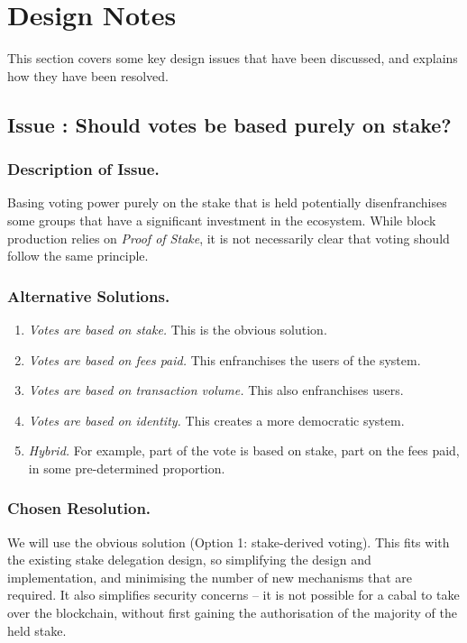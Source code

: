 \pagebreak
\section*{Design Notes}

This section covers some key design issues that have been discussed, and explains how they have been resolved.


\subsection*{Issue \theissue{}: Should votes be based purely on stake?}

\subsubsection*{Description of Issue.}

Basing voting power purely on the stake that is held potentially disenfranchises some groups that have a
significant investment in the ecosystem.  While block production relies on \emph{Proof of Stake},
it is not necessarily clear that voting should follow the same principle.

\subsubsection*{Alternative Solutions.}

\begin{enumerate}
\item
  \emph{Votes are based on stake.}  This is the obvious solution.
\item
  \emph{Votes are based on fees paid.}  This enfranchises the users of the system.
\item
  \emph{Votes are based on transaction volume.}  This also enfranchises users.
\item
  \emph{Votes are based on identity.}  This creates a more democratic system.
\item
  \emph{Hybrid.}  For example, part of the vote is based on stake, part on the fees paid, in some pre-determined proportion.
\end{enumerate}

\subsubsection*{Chosen Resolution.}

We will use the obvious solution (Option 1: stake-derived voting).  This fits
with the existing stake delegation design, so simplifying the design and
implementation, and minimising the number of new mechanisms that are required.
It also simplifies security concerns -- it is not possible for a cabal to take
over the blockchain, without first gaining the authorisation of the majority of
the held stake.

